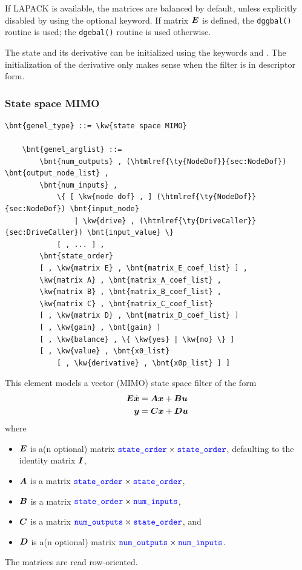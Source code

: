 If LAPACK is available, the matrices are balanced by default,
unless explicitly disabled by using the  optional keyword.
If matrix $\boldsymbol{E}$ is defined, the \texttt{dggbal()} routine is used;
the \texttt{dgebal()} routine is used otherwise.

The state and its derivative can be initialized using the keywords 
and .
The initialization of the derivative only makes sense when the filter
is in descriptor form.

\subsubsection{State space MIMO}
\label{sec:EL:GENEL:STATE-SPACE-MIMO}
\begin{Verbatim}[commandchars=\\\{\}]
    \bnt{genel_type} ::= \kw{state space MIMO}

    \bnt{genel_arglist} ::=
        \bnt{num_outputs} , (\htmlref{\ty{NodeDof}}{sec:NodeDof}) \bnt{output_node_list} ,
        \bnt{num_inputs} ,
            \{ [ \kw{node dof} , ] (\htmlref{\ty{NodeDof}}{sec:NodeDof}) \bnt{input_node}
                | \kw{drive} , (\htmlref{\ty{DriveCaller}}{sec:DriveCaller}) \bnt{input_value} \}
            [ , ... ] ,
        \bnt{state_order}
        [ , \kw{matrix E} , \bnt{matrix_E_coef_list} ] ,
        \kw{matrix A} , \bnt{matrix_A_coef_list} ,
        \kw{matrix B} , \bnt{matrix_B_coef_list} ,
        \kw{matrix C} , \bnt{matrix_C_coef_list}
        [ , \kw{matrix D} , \bnt{matrix_D_coef_list} ]
        [ , \kw{gain} , \bnt{gain} ]
        [ , \kw{balance} , \{ \kw{yes} | \kw{no} \} ]
        [ , \kw{value} , \bnt{x0_list}
            [ , \kw{derivative} , \bnt{x0p_list} ] ]
\end{Verbatim}
This element models a vector (MIMO) state space filter of the form
\begin{align*}
        \boldsymbol{E} \dot{\boldsymbol{x}} &= \boldsymbol{A}\boldsymbol{x}+\boldsymbol{B}\boldsymbol{u} \\
	\boldsymbol{y} &= \boldsymbol{C}\boldsymbol{x}+\boldsymbol{D}\boldsymbol{u}
\end{align*}
where
\begin{itemize}
\item $\boldsymbol{E}$ is a(n optional) matrix
	$\textcolor{blue}{\texttt{state\_order}} \times \textcolor{blue}{\texttt{state\_order}}$, defaulting to the identity matrix $\boldsymbol{I}$,
\item $\boldsymbol{A}$ is a matrix
	$\textcolor{blue}{\texttt{state\_order}} \times \textcolor{blue}{\texttt{state\_order}}$,
\item $\boldsymbol{B}$ is a matrix
	$\textcolor{blue}{\texttt{state\_order}} \times \textcolor{blue}{\texttt{num\_inputs}}$,
\item $\boldsymbol{C}$ is a matrix
	$\textcolor{blue}{\texttt{num\_outputs}} \times \textcolor{blue}{\texttt{state\_order}}$, and
\item $\boldsymbol{D}$ is a(n optional) matrix
	$\textcolor{blue}{\texttt{num\_outputs}} \times \textcolor{blue}{\texttt{num\_inputs}}$.
\end{itemize}
The matrices are read row-oriented.

